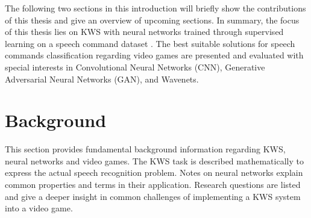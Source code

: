 The following two sections in this introduction will briefly show the contributions of this thesis and give an overview of upcoming sections.
In summary, the focus of this thesis lies on KWS with neural networks trained through supervised learning on a speech command dataset \cite{Warden2018}.
The best suitable solutions for speech commands classification regarding video games are presented and evaluated with special interests in Convolutional Neural Networks (CNN), Generative Adversarial Neural Networks (GAN), and Wavenets.







\chapter{Background}\label{sec:back}
This section provides fundamental background information regarding KWS, neural networks and video games.
The KWS task is described mathematically to express the actual speech recognition problem.
Notes on neural networks explain common properties and terms in their application.
Research questions are listed and give a deeper insight in common challenges of implementing a KWS system into a video game.





